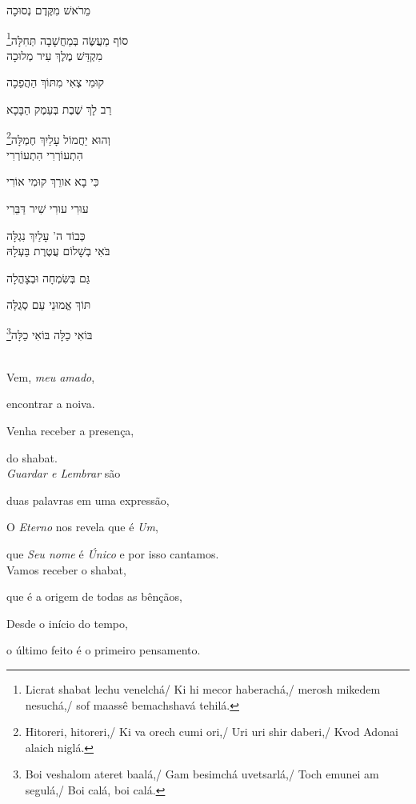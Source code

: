 מֵרֹאשׁ מִקֶּדֶם נְסוּכָה

סוֹף מַעֲשֶּׂה בְּמַחֲשָׁבָה תְּחִלָּה\footnote{Licrat shabat lechu venelchá/ Ki hi mecor haberachá,/ merosh mikedem nesuchá,/ sof maassê bemachshavá tehilá.}\\[10pt]

מִקְדַּשׁ מֶלֶךְ עִיר מְלוּכָה

קוּמִי צְאִי מִתּוֹךְ הַהֲפֵכָה

רַב לָךְ שֶׁבֶת בְּעֵמֶק הַבָּכָא

וְהוּא יַחֲמוֹל עָלַיִךְ חֶמְלָּה\footnote{Hitoreri, hitoreri,/ Ki va orech cumi ori,/ Uri uri shir daberi,/
Kvod Adonai alaich niglá.}\\[10pt]

הִתְעוֹרְרִי הִתְעוֹרְרִי

כִּי בָא אורֵךְ קוּמִי אוֹרִי

עוּרִי עוּרִי שִׁיר דַּבֵּרִי

כְּבוֹד ה' עָלַיִךְ נִגְלָּה\\[10pt]

בֹּאִי בְשָׁלוֹם עֲטֶרֶת בַּעְלָהּ

גַּם בְּשִּׂמְחָה וּבְצָהֳלָה

תּוֹךְ אֱמוּנֵי עַם סְגֻלָּה

בּוֹאִי כַלָּה בּוֹאִי כַלָּה\footnote{
Boi veshalom ateret baalá,/ Gam besimchá uvetsarlá,/
Toch emunei am segulá,/ Boi calá, boi calá.}

\movetooddpage
\raggedright

\textsc{}\\[15pt]

Vem, \emph{meu amado},

encontrar a noiva.

Venha receber a presença,

do shabat.\\[10pt]

\emph{Guardar e Lembrar} são

duas palavras em uma expressão,

O \emph{Eterno} nos revela que é \emph{Um},

que \emph{Seu nome} é \emph{Único} e por isso cantamos.\\[10pt]

Vamos receber o shabat,

que é a origem de todas as bênçãos,

Desde o início do tempo,

o último feito é o primeiro pensamento.\\[10pt]

